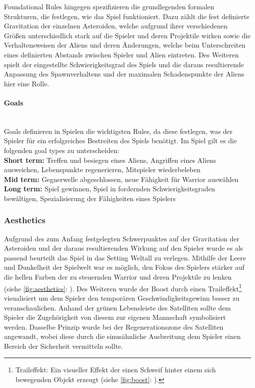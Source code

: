 \documentclass[11pt]{scrartcl}
\newcommand{\lbparagraph}[1]{\paragraph*{#1}\mbox{}\\}
\begin{document}
Foundational Rules hingegen spezifizieren die grundlegenden formalen Strukturen, die festlegen, wie das Spiel funktioniert\cite{K2011}. Dazu zählt die fest definierte Gravitation der einzelnen Asteroiden, welche aufgrund ihrer verschiedenen Größen unterschiedlich stark auf die Spieler und deren Projektile wirken sowie die Verhaltensweisen der Aliens und deren Änderungen, welche beim Unterschreiten eines definierten Abstands zwischen Spieler und Alien eintreten. Des Weiteren spielt der eingestellte Schwierigkeitsgrad des Spiels und die daraus resultierende Anpassung des Spawnverhaltens und der maximalen Schadenspunkte der Aliens hier eine Rolle.
\lbparagraph{Goals}
Goals definieren in Spielen die wichtigsten Rules, da diese festlegen, was der Spieler für ein erfolgreiches Bestreiten des Spiels benötigt\cite[~p.145]{S2014}. Im Spiel gilt es die folgenden goal types zu unterscheiden: \\
\textbf{Short term:} Treffen und besiegen eines Aliens, Angriffen eines Aliens ausweichen, Lebenspunkte regenerieren, Mitspieler wiederbeleben \\
\textbf{Mid term:} Gegnerwelle abgeschlossen, neue Fähigkeit für Warrior auswählen \\
\textbf{Long term:} Spiel gewinnen, Spiel in fordernden Schwierigkeitsgraden bewältigen, Spezialisierung der Fähigkeiten eines Spielers

\subsubsection{Aesthetics}
Aufgrund des zum Anfang festgelegten Schwerpunktes auf der Gravitation der Asteroiden und der daraus resultierenden Wirkung auf den Spieler wurde es als passend beurteilt das Spiel in das Setting Weltall zu verlegen. Mithilfe der Leere und Dunkelheit der Spielwelt war es möglich, den Fokus des Spielers stärker auf die hellen Farben der zu steuernden Warrior und deren Projektile zu lenken (siehe \autoref{fig:aesthetics}: ). Des Weiteren wurde der Boost durch einen Traileffekt\footnote{Traileffekt: Ein visueller Effekt der einen Schweif hinter einem sich bewegenden Objekt erzeugt (siehe \autoref{fig:boost}: ).} visualisiert um dem Spieler den temporären Geschwindigkeitsgewinn besser zu veranschaulichen. Anhand der grünen Lebensleiste des Satelliten sollte dem Spieler die Zugehörigkeit von diesem zur eigenen Mannschaft symbolisiert werden. Dasselbe Prinzip wurde bei der Regenerationszone des Satelliten angewandt, wobei diese durch die sinusähnliche Ausbreitung dem Spieler einen Bereich der Sicherheit vermitteln sollte.
\end{document}

